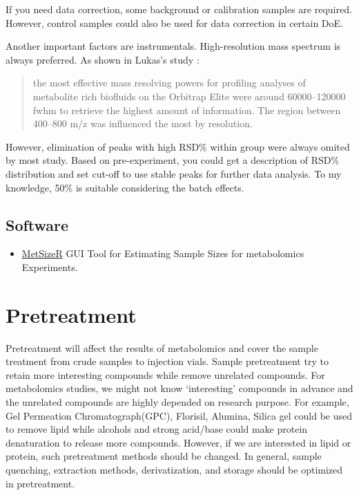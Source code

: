 \documentclass[
]{book}
\providecommand{\tightlist}{%
  \setlength{\itemsep}{0pt}\setlength{\parskip}{0pt}}
\begin{document}
If you need data correction, some background or calibration samples are required. However, control samples could also be used for data correction in certain DoE.

Another important factors are instrumentals. High-resolution mass spectrum is always preferred. As shown in Lukas's study \citep{najdekr2016}:

\begin{quote}
the most effective mass resolving powers for profiling analyses of metabolite rich biofluids on the Orbitrap Elite were around 60000--120000 fwhm to retrieve the highest amount of information. The region between 400--800 m/z was influenced the most by resolution.
\end{quote}

However, elimination of peaks with high RSD\% within group were always omited by most study. Based on pre-experiment, you could get a description of RSD\% distribution and set cut-off to use stable peaks for further data analysis. To my knowledge, 50\% is suitable considering the batch effects.

\hypertarget{software}{%
\section{Software}\label{software}}

\begin{itemize}
\tightlist
\item
  \href{https://github.com/cran/MetSizeR}{MetSizeR} GUI Tool for Estimating Sample Sizes for metabolomics Experiments.
\end{itemize}

\hypertarget{pretreatment}{%
\chapter{Pretreatment}\label{pretreatment}}

Pretreatment will affect the results of metabolomics and cover the sample treatment from crude samples to injection vials. Sample pretreatment try to retain more interesting compounds while remove unrelated compounds. For metabolomics studies, we might not know `interesting' compounds in advance and the unrelated compounds are highly depended on research purpose. For example, Gel Permeation Chromatograph(GPC), Florisil, Alumina, Silica gel could be used to remove lipid while alcohols and strong acid/base could make protein denaturation to release more compounds. However, if we are interested in lipid or protein, such pretreatment methods should be changed. In general, sample quenching, extraction methods, derivatization, and storage should be optimized in pretreatment.
\end{document}
